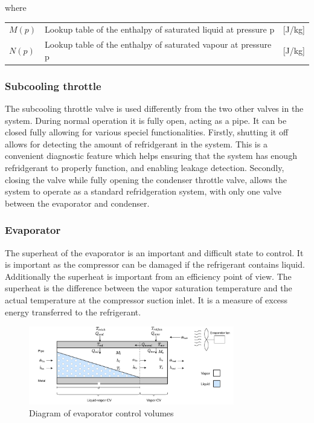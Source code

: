where

\begin{center}
	\begin{tabular}{l p{8cm} l}
		$M(p)$			&  Lookup table of the enthalpy of saturated liquid	at pressure p		& [\si{J}/\si{kg}]\\
		$N(p)$			&  Lookup table of the enthalpy of saturated vapour	at pressure p		& [\si{J}/\si{kg}] \\
		
	\end{tabular}
\end{center}

\subsubsection{Subcooling throttle}
The subcooling throttle valve is used differently from the two other valves in the system. During normal operation it is fully open, acting as a pipe. It can be closed fully allowing for various speciel functionalities. Firstly, shutting it off allows for detecting the amount of refridgerant in the system. This is a convenient diagnostic feature which helps ensuring that the system has enough refridgerant to properly function, and enabling leakage detection. Secondly, closing the valve while fully opening the condenser throttle valve, allows the system to operate as a standard refridgeration system, with only one valve between the evaporator and condenser.


\subsubsection{Evaporator}
The superheat of the evaporator is an important and difficult state to control. It is important as the compressor can be damaged if the refrigerant contains liquid. Additionally the superheat is important from an efficiency point of view.
The superheat is the difference between the vapor saturation temperature and the actual temperature at the compressor suction inlet. It is a measure of excess energy transferred to the refrigerant.

\clearpage

\begin{figure}[h!]
	\centering
	\includegraphics[width=0.8\textwidth]{Graphics/Evaporator_CV_diagram.pdf}
	\caption{Diagram of evaporator control volumes}
	\label{fig:evapo_CV}
\end{figure}

